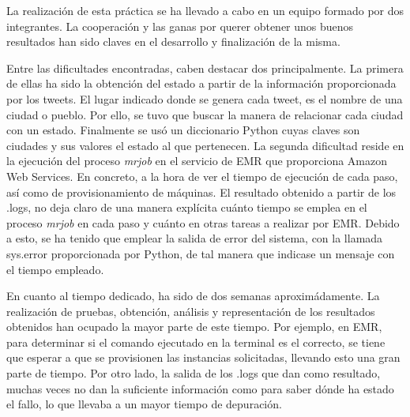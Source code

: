 \documentclass[10pt, spanish]{article}
\begin{document}
La realización de esta práctica se ha llevado a cabo en un equipo formado por dos integrantes. La cooperación y las ganas por querer obtener unos buenos resultados han sido claves en el desarrollo y finalización de la misma.

Entre las dificultades encontradas, caben destacar dos principalmente. La primera de ellas ha sido la obtención del estado a partir de la información proporcionada por los tweets. El lugar indicado donde se genera cada tweet, es el nombre de una ciudad o pueblo. Por ello, se tuvo que buscar la manera de relacionar cada ciudad con un estado. Finalmente se usó un diccionario Python \cite{USCityDic} cuyas claves son ciudades y sus valores el estado al que pertenecen. La segunda dificultad reside en la ejecución del proceso \textit{mrjob} en el servicio de EMR que proporciona Amazon Web Services. En concreto, a la hora de ver el tiempo de ejecución de cada paso, así como de provisionamiento de máquinas. El resultado obtenido a partir de los .logs, no deja claro de una manera explícita cuánto tiempo se emplea en el proceso \textit{mrjob} en cada paso y cuánto en otras tareas a realizar por EMR. Debido a esto, se ha tenido que emplear la salida de error del sistema, con la llamada sys.error proporcionada por Python, de tal manera que indicase un mensaje con el tiempo empleado.

En cuanto al tiempo dedicado, ha sido de dos semanas aproximádamente. La realización de pruebas, obtención, análisis y representación de los resultados obtenidos han ocupado la mayor parte de este tiempo. Por ejemplo, en EMR, para determinar si el comando ejecutado en la terminal es el correcto, se tiene que esperar a que se provisionen las instancias solicitadas, llevando esto una gran parte de tiempo. Por otro lado, la salida de los .logs que dan como resultado, muchas veces no dan la suficiente información como para saber dónde ha estado el fallo, lo que llevaba a un mayor tiempo de depuración.


\end{document}
